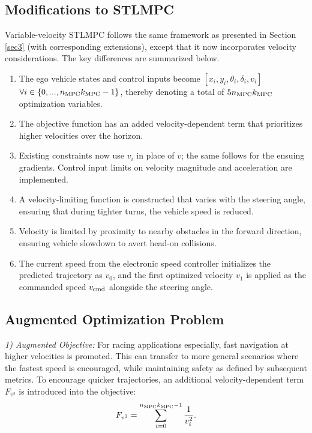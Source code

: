 \documentclass[journal]{IEEEtran}
\begin{document}
\subsection{Modifications to STLMPC}
Variable-velocity STLMPC follows the same framework as presented in Section \ref{sec3} (with corresponding extensions), except that it now incorporates velocity considerations. The key differences are summarized below.
\begin{enumerate}
\item{The ego vehicle states and control inputs become $[x_i,y_i,\theta_i,\delta_i,v_i]$ $\forall i\in\{0,...,n_\textup{MPC}k_\textup{MPC}-1\}$, thereby denoting a total of $5n_\textup{MPC}k_\textup{MPC}$ optimization variables.}
\item{The objective function has an added velocity-dependent term that prioritizes higher velocities over the horizon.}
\item{Existing constraints now use $v_i$ in place of $v$; the same follows for the ensuing gradients. Control input limits on velocity magnitude and acceleration are implemented.}
\item{A velocity-limiting function is constructed that varies with the steering angle, ensuring that during tighter turns, the vehicle speed is reduced.}
\item{Velocity is limited by proximity to nearby obstacles in the forward direction, ensuring vehicle slowdown to avert head-on collisions.}
\item{The current speed from the electronic speed controller initializes the predicted trajectory as $v_0$, and the first optimized velocity $v_1$ is applied as the commanded speed $v_\textup{cmd}$ alongside the steering angle.}

\end{enumerate}

\subsection{Augmented Optimization Problem}
\indent \textit{1) Augmented Objective:}
For racing applications especially, fast navigation at higher velocities is promoted. This can transfer to more general scenarios where the fastest speed is encouraged, while maintaining safety as defined by subsequent metrics. To encourage quicker trajectories, an additional velocity-dependent term $F_{v^2}$ is introduced into the objective:
\begin{equation}
  F_{v^2}=\sum_{i=0}^{n_\textup{MPC}k_\textup{MPC}-1}\frac{1}{v_i^2}.
  \label{5.2.1}
\end{equation}
\end{document}
